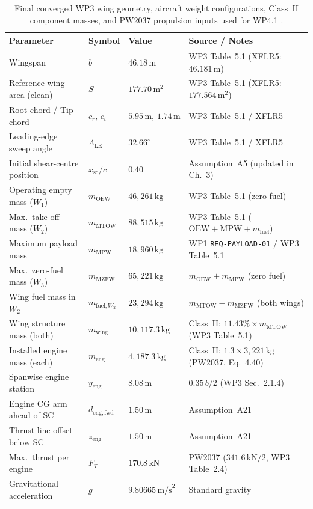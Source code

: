 \begin{table}[htbp]
    \centering
    \caption{Final converged WP3 wing geometry, aircraft weight configurations, Class~II component masses, and PW2037 propulsion inputs used for WP4.1 \cite{wp3}.}
    \label{tab:wp41_inputs}
    \begin{tabular}{@{}llll@{}}
        \toprule
        \textbf{Parameter} & \textbf{Symbol} & \textbf{Value} & \textbf{Source / Notes} \\
        \midrule
        Wingspan & $b$ & $46.18\,\text{m}$ & WP3 Table~5.1 (XFLR5: $46.181\,\text{m}$) \\
        Reference wing area (clean) & $S$ & $177.70\,\text{m}^2$ & WP3 Table~5.1 (XFLR5: $177.564\,\text{m}^2$) \\
        Root chord / Tip chord & $c_r,\, c_t$ & $5.95\,\text{m},\, 1.74\,\text{m}$ & WP3 Table~5.1 / XFLR5 \\
        Leading-edge sweep angle & $\Lambda_{\mathrm{LE}}$ & $32.66^\circ$ & WP3 Table~5.1 / XFLR5 \\
        Initial shear-centre position & $x_{\mathrm{sc}}/c$ & $0.40$ & Assumption~A5 (updated in Ch.~3) \\
        \midrule
        Operating empty mass ($W_1$) & $m_{\mathrm{OEW}}$ & $46{,}261\,\text{kg}$ & WP3 Table~5.1 (zero fuel) \\
        Max.\ take-off mass ($W_2$) & $m_{\mathrm{MTOW}}$ & $88{,}515\,\text{kg}$ & WP3 Table~5.1 ($\mathrm{OEW} + \mathrm{MPW} + m_{\mathrm{fuel}}$) \\
        Maximum payload mass & $m_{\mathrm{MPW}}$ & $18{,}960\,\text{kg}$ & WP1 \texttt{REQ-PAYLOAD-01} / WP3 Table~5.1 \\
        Max.\ zero-fuel mass ($W_3$) & $m_{\mathrm{MZFW}}$ & $65{,}221\,\text{kg}$ & $m_{\mathrm{OEW}} + m_{\mathrm{MPW}}$ (zero fuel) \\
        Wing fuel mass in $W_2$ & $m_{\mathrm{fuel}, W_2}$ & $23{,}294\,\text{kg}$ & $m_{\mathrm{MTOW}} - m_{\mathrm{MZFW}}$ (both wings) \\
        Wing structure mass (both) & $m_{\mathrm{wing}}$ & $10{,}117.3\,\text{kg}$ & Class~II: $11.43\% \times m_{\mathrm{MTOW}}$ (WP3 Table~5.1) \\
        Installed engine mass (each) & $m_{\mathrm{eng}}$ & $4{,}187.3\,\text{kg}$ & Class~II: $1.3 \times 3{,}221\,\text{kg}$ (PW2037, Eq.~4.40) \\
        \midrule
        Spanwise engine station & $y_{\mathrm{eng}}$ & $8.08\,\text{m}$ & $0.35\,b/2$ (WP3 Sec.~2.1.4) \\
        Engine CG arm ahead of SC & $d_{\mathrm{eng,fwd}}$ & $1.50\,\text{m}$ & Assumption~A21 \\
        Thrust line offset below SC & $z_{\mathrm{eng}}$ & $1.50\,\text{m}$ & Assumption~A21 \\
        Max.\ thrust per engine & $F_T$ & $170.8\,\text{kN}$ & PW2037 ($341.6\,\text{kN}/2$, WP3 Table~2.4) \\
        Gravitational acceleration & $g$ & $9.80665\,\text{m/s}^2$ & Standard gravity \\
        \bottomrule
    \end{tabular}
\end{table}

